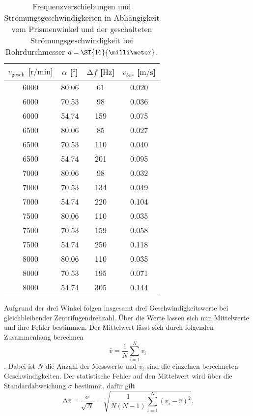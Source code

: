 \begin{table}
    \centering
    \caption{Frequenzverschiebungen und Strömungsgeschwindigkeiten in Abhängigkeit vom Prismenwinkel und der geschalteten Strömungsgeschwindigkeit bei Rohrdurchmesser $\protect d = \SI{16}{\milli\meter}$.}
    \label{tab:6}
    \begin{tabular}{c c c c}
        \toprule
        $v_{\text{gesch}}$ [$\si{{\text{r}}\per\minute}$]  & $\alpha$ [$\si{\degree}$]  & $\increment f$ [$\si{\hertz}$] & $v_{ber}$ [$\si{\meter\per\second}$]\\
        \midrule
        6000    &   80.06    & 61   & 0.020 \\ 
        6000    &   70.53    & 98   & 0.036 \\ 
        6000    &   54.74    & 159  & 0.075 \\ 
        \midrule
        6500    &   80.06   & 85    & 0.027 \\ 
        6500    &   70.53   & 110   & 0.040 \\ 
        6500    &   54.74   & 201   & 0.095 \\ 
        \midrule
        7000    &   80.06   & 98    & 0.032 \\ 
        7000    &   70.53   & 134   & 0.049 \\ 
        7000    &   54.74   & 220   & 0.104 \\ 
        \midrule
        7500    &   80.06   & 110   & 0.035 \\ 
        7500    &   70.53   & 159   & 0.058 \\ 
        7500    &   54.74   & 250   & 0.118 \\ 
        \midrule
        8000    &   80.06   & 110   & 0.035 \\ 
        8000    &   70.53   & 195   & 0.071 \\ 
        8000    &   54.74   & 305   & 0.144 \\ 
        \bottomrule
    \end{tabular}
\end{table}   
                            
Aufgrund der drei Winkel folgen insgesamt drei Geschwindigkeitswerte bei gleichbleibender Zentrifugendrehzahl. Über die Werte lassen sich nun Mittelwerte und ihre Fehler bestimmen.
Der Mittelwert lässt sich durch folgenden Zusammenhang berechnen
\begin{equation}
    \label{eqn:mittel}
\bar{v} = \frac{1}{N} \sum_{i=1}^{N} v_{i}
\end{equation}.
Dabei ist $N$ die Anzahl der Messwerte und $v_{i}$ sind die einzelnen berechneten Geschwindigkeiten.
Der statistische Fehler auf den Mittelwert wird über die Standardabweichung $\sigma$ bestimmt, dafür gilt
\begin{equation}
    \label{eqn:sem}
\increment \bar{v} = \frac{\sigma}{\sqrt{N}} = \sqrt{\frac{1}{N(N-1)} \sum_{i=1}^{N} (v_{i} - \bar{v})^{2}}.
\end{equation}            
                           

